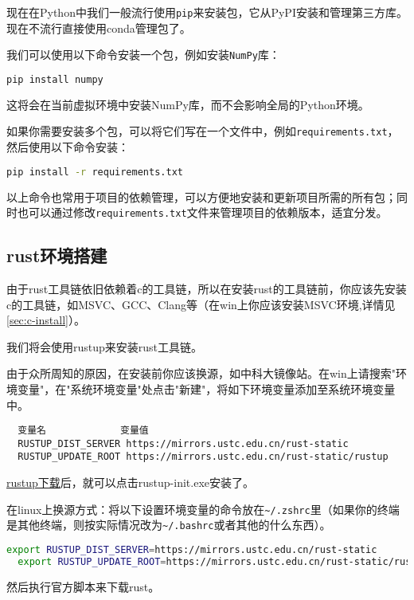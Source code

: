 现在在Python中我们一般流行使用\texttt{pip}来安装包，它从PyPI安装和管理第三方库。现在不流行直接使用conda管理包了。

我们可以使用以下命令安装一个包，例如安装\texttt{NumPy}库：
\begin{lstlisting}[language=bash]
    pip install numpy
\end{lstlisting}
这将会在当前虚拟环境中安装NumPy库，而不会影响全局的Python环境。

如果你需要安装多个包，可以将它们写在一个文件中，例如\texttt{requirements.txt}，然后使用以下命令安装：
\begin{lstlisting}[language=bash]
    pip install -r requirements.txt
\end{lstlisting}
以上命令也常用于项目的依赖管理，可以方便地安装和更新项目所需的所有包；同时也可以通过修改\texttt{requirements.txt}文件来管理项目的依赖版本，适宜分发。

\subsection{rust环境搭建}

由于rust工具链依旧依赖着c的工具链，所以在安装rust的工具链前，你应该先安装c的工具链，如MSVC、GCC、Clang等（在win上你应该安装MSVC环境,详情见\ref{sec:c-install}）。

我们将会使用rustup来安装rust工具链。

由于众所周知的原因，在安装前你应该换源，如中科大镜像站。在win上请搜索"环境变量"，在"系统环境变量"处点击"新建"，将如下环境变量添加至系统环境变量中。

\begin{lstlisting}
  变量名             变量值
  RUSTUP_DIST_SERVER https://mirrors.ustc.edu.cn/rust-static
  RUSTUP_UPDATE_ROOT https://mirrors.ustc.edu.cn/rust-static/rustup
\end{lstlisting}

\href{https://rustup.rs}{rustup下载}后，就可以点击rustup-init.exe安装了。

在linux上换源方式：将以下设置环境变量的命令放在\texttt{\textasciitilde/.zshrc}里（如果你的终端是其他终端，则按实际情况改为\texttt{\textasciitilde/.bashrc}或者其他的什么东西）。

\begin{lstlisting}[language=bash]
  export RUSTUP_DIST_SERVER=https://mirrors.ustc.edu.cn/rust-static
  export RUSTUP_UPDATE_ROOT=https://mirrors.ustc.edu.cn/rust-static/rustup
\end{lstlisting}

然后执行官方脚本来下载rust。


